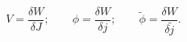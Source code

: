 \begin{equation}
V = \frac{\delta W}{\delta J};\qquad
\phi = \frac{\delta W}{\delta j};\qquad
\tilde\phi = \frac{\delta W}{\delta\tilde j}.
\end{equation}

